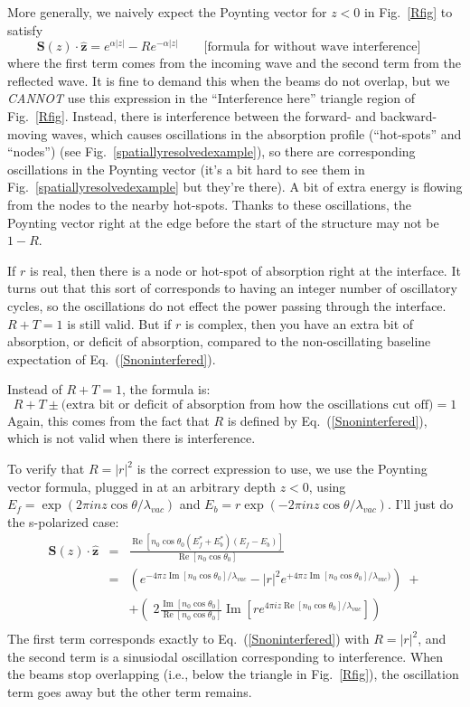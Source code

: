 \documentclass[12pt]{article}
\newcommand{\bea}{\begin{eqnarray*}} %
\newcommand{\eea}{\end{eqnarray*}} %
\newcommand{\be}[1]{\begin{equation}\label{#1}} %
\newcommand{\ee}{\end{equation}} %
\renewcommand{\(}{\left(}
\renewcommand{\)}{\right)}
\renewcommand{\Im}{\operatorname{Im}}
\renewcommand{\Re}{\operatorname{Re}}
\renewcommand{\S}{\mathbf{S}}
\newcommand{\z}{\hat{\mathbf{z}}}
\begin{document}
More generally, we naively expect the Poynting vector for $z<0$ in Fig.~\ref{Rfig} to satisfy
\be{Snoninterfered} \S(z)\cdot \z = e^{\alpha |z|} - R e^{-\alpha |z|} \qquad \text{[formula for without wave  interference]} \quad \ee
where the first term comes from the incoming wave and the second term from the reflected wave. It is fine to demand this when the beams do not overlap, but we \emph{CANNOT} use this expression in the ``Interference here'' triangle region of Fig.~\ref{Rfig}. Instead, there is interference between the forward- and backward-moving waves, which causes oscillations in the absorption profile (``hot-spots'' and ``nodes'') (see Fig.~\ref{spatiallyresolvedexample}), so there are corresponding oscillations in the Poynting vector (it's a bit hard to see them in Fig.~\ref{spatiallyresolvedexample} but they're there).  A bit of extra energy is flowing from the nodes to the nearby hot-spots. Thanks to these oscillations, the Poynting vector right at the edge before the start of the structure may not be $1-R$.

If $r$ is real, then there is a node or hot-spot of absorption right at the interface. It turns out that this sort of corresponds to having an integer number of oscillatory cycles, so the oscillations do not effect the power passing through the interface. $R+T=1$ is still valid. But if $r$ is complex, then you have an extra bit of absorption, or deficit of absorption, compared to the non-oscillating baseline expectation of Eq.~(\ref{Snoninterfered}).

Instead of $R+T=1$, the formula is:
$$R+T\pm \text{(extra bit or deficit of absorption from how the oscillations cut off)} = 1$$
Again, this comes from the fact that $R$ is defined by Eq.~(\ref{Snoninterfered}), which is not valid when there is interference.

To verify that $R=|r|^2$ is the correct expression to use, we use the Poynting vector formula, plugged in at an arbitrary depth $z<0$, using $E_f = \exp(2\pi i n z \cos \theta / \lambda_{vac})$ and $E_b = r \exp(-2\pi i n z \cos\theta/\lambda_{vac})$. I'll just do the s-polarized case:
\bea
\S(z)\cdot\z
&=& \frac{\Re[n_0 \cos \theta_0 (E_f^* + E_b^*)(E_f-E_b)]}{\Re[n_0 \cos \theta_0]}\\
&=& \(e^{-4\pi z \Im[n_0 \cos \theta_0]/\lambda_{vac}}-|r|^2 e^{+4\pi z \Im[n_0 \cos \theta_0]/\lambda_{vac})}\) \; +\\
&\;& + \( \; 2\frac{\Im[n_0 \cos\theta_0]}{\Re[n_0 \cos \theta_0]} \Im [r e^{4\pi i z\Re[n_0  \cos \theta_0]/\lambda_{vac}}] \)\\
\eea
The first term corresponds exactly to Eq.~(\ref{Snoninterfered}) with $R=|r|^2$, and the second term is a sinusiodal oscillation corresponding to interference. When the beams stop overlapping (i.e., below the triangle in Fig.~\ref{Rfig}), the oscillation term goes away but the other term remains.
\end{document}
